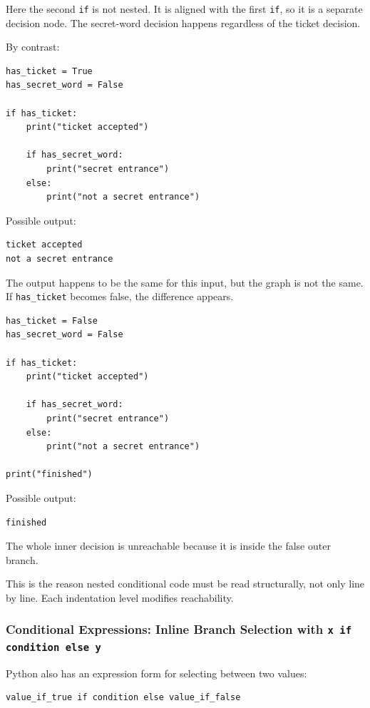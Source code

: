 \documentclass[a4paper,twoside]{report}
\begin{document}
Here the second \texttt{if} is not nested. It is aligned with the first \texttt{if}, so it is a separate decision node. The secret-word decision happens regardless of the ticket decision.

By contrast:

\begin{verbatim}
has_ticket = True
has_secret_word = False

if has_ticket:
    print("ticket accepted")

    if has_secret_word:
        print("secret entrance")
    else:
        print("not a secret entrance")
\end{verbatim}

Possible output:

\begin{verbatim}
ticket accepted
not a secret entrance
\end{verbatim}

The output happens to be the same for this input, but the graph is not the same. If \texttt{has\_ticket} becomes false, the difference appears.

\begin{verbatim}
has_ticket = False
has_secret_word = False

if has_ticket:
    print("ticket accepted")

    if has_secret_word:
        print("secret entrance")
    else:
        print("not a secret entrance")

print("finished")
\end{verbatim}

Possible output:

\begin{verbatim}
finished
\end{verbatim}

The whole inner decision is unreachable because it is inside the false outer branch.

This is the reason nested conditional code must be read structurally, not only line by line. Each indentation level modifies reachability.

\subsubsection{Conditional Expressions: Inline Branch Selection with \texttt{x if condition else y}}

Python also has an expression form for selecting between two values:

\begin{verbatim}
value_if_true if condition else value_if_false
\end{verbatim}
\end{document}
